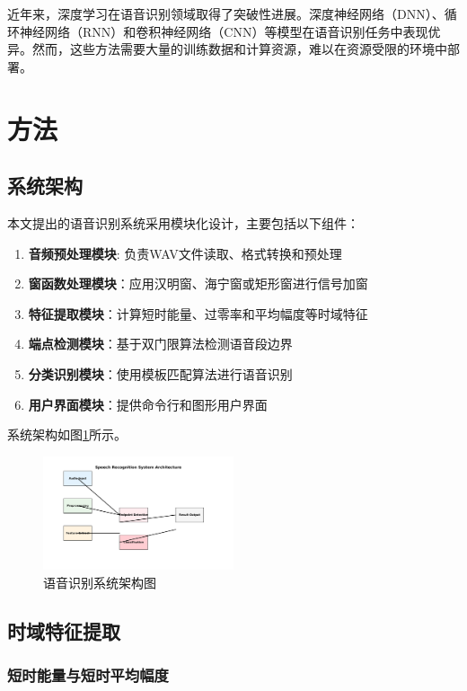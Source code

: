 \documentclass[sigconf,nonacm]{acmart}
\begin{document}
近年来，深度学习在语音识别领域取得了突破性进展。深度神经网络（DNN）、循环神经网络（RNN）和卷积神经网络（CNN）等模型在语音识别任务中表现优异。然而，这些方法需要大量的训练数据和计算资源，难以在资源受限的环境中部署。

\section{方法}

\subsection{系统架构}

本文提出的语音识别系统采用模块化设计，主要包括以下组件：

\begin{enumerate}
\item \textbf{音频预处理模块}: 负责WAV文件读取、格式转换和预处理
\item \textbf{窗函数处理模块}：应用汉明窗、海宁窗或矩形窗进行信号加窗
\item \textbf{特征提取模块}：计算短时能量、过零率和平均幅度等时域特征
\item \textbf{端点检测模块}：基于双门限算法检测语音段边界
\item \textbf{分类识别模块}：使用模板匹配算法进行语音识别
\item \textbf{用户界面模块}：提供命令行和图形用户界面
\end{enumerate}

系统架构如图\ref{fig:system_architecture}所示。

\begin{figure}[htbp]
\centering
\includegraphics[width=0.5\textwidth]{system_architecture.png}
\caption{语音识别系统架构图}
\label{fig:system_architecture}
\end{figure}

\subsection{时域特征提取}

\subsubsection{短时能量与短时平均幅度}
\end{document}
